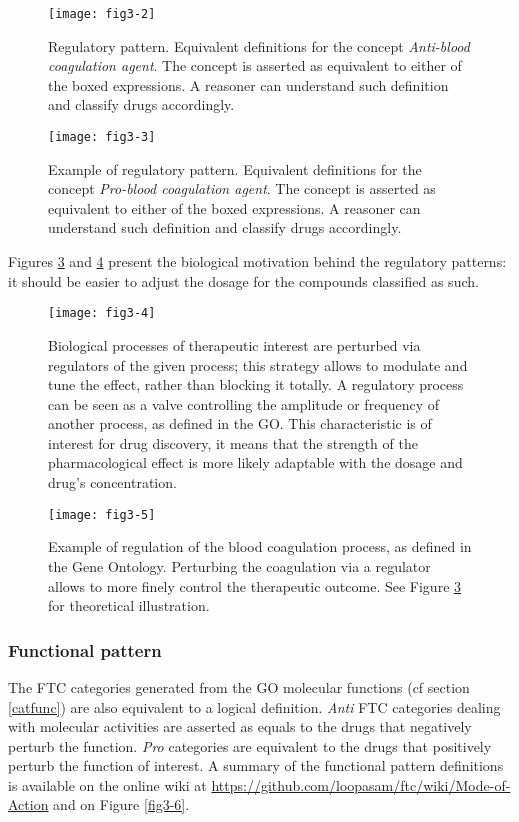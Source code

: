 \begin{figure}[ht]
    \centering
    \texttt{[image: fig3-2]}
    \caption{Regulatory pattern. Equivalent definitions for the concept \emph{Anti-blood coagulation agent}. The concept is asserted as equivalent to either of the boxed expressions. A reasoner can understand such definition and classify drugs accordingly.}
    \label{fig3-2}
\end{figure}

\begin{figure}[H]
    \centering
    \texttt{[image: fig3-3]}
    \caption{Example of regulatory pattern. Equivalent definitions for the concept \emph{Pro-blood coagulation agent}. The concept is asserted as equivalent to either of the boxed expressions. A reasoner can understand such definition and classify drugs accordingly.}
    \label{fig3-3}
\end{figure}

Figures \ref{fig3-4} and \ref{fig3-5} present the biological motivation behind the regulatory patterns: it should be easier to adjust the dosage for the compounds classified as such.

\begin{figure}[ht]
    \centering
    \texttt{[image: fig3-4]}
    \caption{Biological processes of therapeutic interest are perturbed via regulators of the given process; this strategy allows to modulate and tune the effect, rather than blocking it totally. A regulatory process can be seen as a valve controlling the amplitude or frequency of another process, as defined in the GO. This characteristic is of interest for drug discovery, it means that the strength of the pharmacological effect is more likely adaptable with the dosage and drug's concentration.}
    \label{fig3-4}
\end{figure}

\begin{figure}[H]
    \centering
    \texttt{[image: fig3-5]}
    \caption{Example of regulation of the blood coagulation process, as defined in the Gene Ontology. Perturbing the coagulation via a regulator allows to more finely control the therapeutic outcome. See Figure \ref{fig3-4} for theoretical illustration.}
    \label{fig3-5}
\end{figure}

\subsubsection{Functional pattern}
The FTC categories generated from the GO molecular functions (cf section \ref{catfunc}) are also equivalent to a logical definition. \emph{Anti} FTC categories dealing with molecular activities are asserted as equals to the drugs that negatively perturb the function. \emph{Pro} categories are equivalent to the drugs that positively perturb the function of interest. A summary of the functional pattern definitions is available on the online wiki at \url{https://github.com/loopasam/ftc/wiki/Mode-of-Action} and on Figure \ref{fig3-6}.

